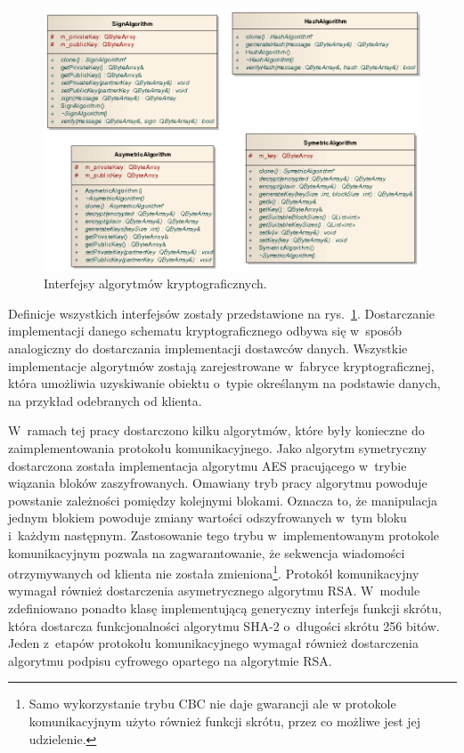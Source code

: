 \begin{figure}[htbp]
  \centering
  \caption{Interfejsy algorytmów kryptograficznych.}
  \label{fig:cryptoInterface}
\includegraphics[width=1\textwidth]{img/crypto.png}
\end{figure}

Definicje wszystkich interfejsów zostały przedstawione na
rys.~\ref{fig:cryptoInterface}. Dostarczanie implementacji danego
schematu kryptograficznego odbywa się w~sposób analogiczny do
dostarczania implementacji dostawców danych. Wszystkie implementacje
algorytmów zostają zarejestrowane w~fabryce kryptograficznej, która
umożliwia uzyskiwanie obiektu o~typie określanym na podstawie danych,
na przykład odebranych od klienta.

W~ramach tej pracy dostarczono kilku algorytmów, które były konieczne
do zaimplementowania protokołu komunikacyjnego. Jako algorytm
symetryczny dostarczona została implementacja algorytmu AES
pracującego w~trybie wiązania bloków zaszyfrowanych. Omawiany tryb
pracy algorytmu powoduje powstanie zależności pomiędzy kolejnymi
blokami. Oznacza to, że manipulacja jednym blokiem powoduje zmiany
wartości odszyfrowanych w~tym bloku i~każdym następnym. Zastosowanie
tego trybu w~implementowanym protokole komunikacyjnym pozwala na
zagwarantowanie, że sekwencja wiadomości otrzymywanych od klienta nie
została zmieniona\footnote{Samo wykorzystanie trybu CBC nie daje
  gwarancji ale w protokole komunikacyjnym użyto również
  funkcji skrótu, przez co możliwe jest jej udzielenie.}. Protokół
komunikacyjny wymagał również dostarczenia asymetrycznego algorytmu
RSA. W~module zdefiniowano ponadto klasę implementującą generyczny
interfejs funkcji skrótu, która dostarcza funkcjonalności algorytmu
SHA-2 o~długości skrótu 256 bitów. Jeden z~etapów protokołu
komunikacyjnego wymagał również dostarczenia algorytmu podpisu
cyfrowego opartego na algorytmie RSA.

